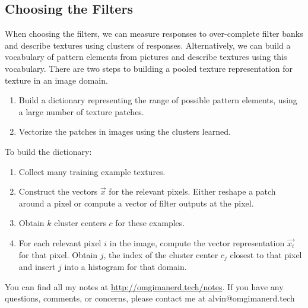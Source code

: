 \documentclass{math}
\begin{document}
\subsection*{Choosing the Filters}
When choosing the filters, we can measure responses to over-complete filter
banks and describe textures using clusters of responses. Alternatively, we can
build a vocabulary of pattern elements from pictures and describe textures using
this vocabulary. There are two steps to building a pooled texture representation
for texture in an image domain.
\begin{enumerate}
  \item Build a dictionary representing the range of possible pattern elements,
    using a large number of texture patches.
  \item Vectorize the patches in images using the clusters learned.
\end{enumerate}
To build the dictionary:
\begin{enumerate}
  \item Collect many training example textures.
  \item Construct the vectors \( \vec{x} \) for the relevant pixels. Either
    reshape a patch around a pixel or compute a vector of filter outputs
    at the pixel.
  \item Obtain \( k \) cluster centers \( c \) for these examples.
  \item For each relevant pixel \( i \) in the image, compute the vector
    representation \( \vec{x_i} \) for that pixel. Obtain \( j \), the index
    of the cluster center \( c_j \) closest to that pixel and insert \( j \)
    into a histogram for that domain.
\end{enumerate}

\begin{center}
  You can find all my notes at \url{http://omgimanerd.tech/notes}. If you have
  any questions, comments, or concerns, please contact me at
  alvin@omgimanerd.tech
\end{center}
\end{document}
